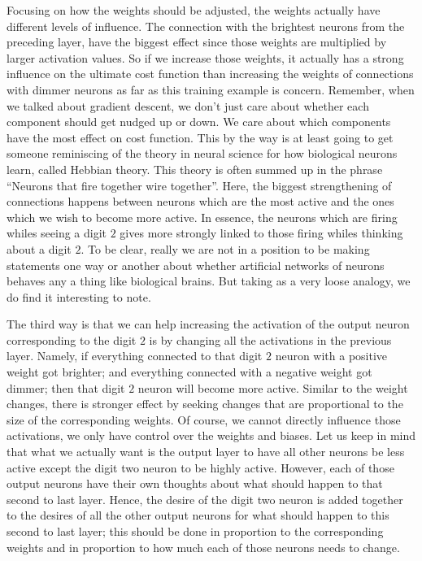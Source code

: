 \documentclass[master]{thesis-uestc}
\begin{document}
Focusing on how the weights should be adjusted, the weights actually have different levels of influence. The connection with the brightest neurons from the preceding layer, have the biggest effect since those weights are multiplied by larger activation values. So if we increase those weights, it actually has a strong influence on the ultimate cost function than increasing the weights of connections with dimmer neurons as far as this training example is concern. Remember, when we talked about gradient descent, we don't just care about whether each component should get nudged up or down. We care about which components have the most effect on cost function. This by the way is at least going to get someone reminiscing of the theory in neural science for how biological neurons learn, called Hebbian theory\cite{Donald1949}. This theory is often summed up in the phrase ``Neurons that fire together wire together''. Here, the biggest strengthening of connections happens between neurons which are the most active and the ones which we wish to become more active. In essence, the neurons which are firing whiles seeing a digit $2$ gives more strongly linked to those firing whiles thinking about a digit $2$. To be clear, really we are not in a position to be making statements one way or another about whether artificial networks of neurons behaves any a thing like biological brains. But taking as a very loose analogy, we do find it interesting to note.

The third way is that we can help increasing the activation of the output neuron corresponding to the digit $2$ is by changing all the activations in the previous layer. Namely, if everything connected to that digit $2$ neuron with a positive weight got brighter; and everything connected with a negative weight got dimmer; then that digit $2$ neuron will become more active. Similar to the weight changes, there is stronger effect by seeking changes that are proportional to the size of the corresponding weights. Of course, we cannot directly influence those activations, we only have control over the weights and biases. Let us keep in mind that what we actually want is the output layer to have all other neurons be less active except the digit two neuron to be highly active. However, each of those output neurons have their own thoughts about what should happen to that second to last layer. Hence, the desire of the digit two neuron is added together to the desires of all the other output neurons for what should happen to this second to last layer; this should be done in proportion to the corresponding weights and in proportion to how much each of those neurons needs to change.
\end{document}
